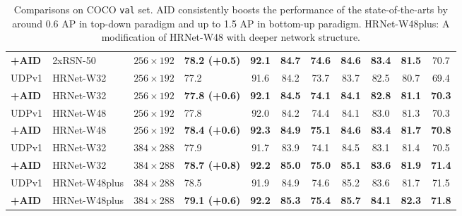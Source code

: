 \documentclass[final]{cvpr}
\begin{document}
\begin{table*}
\begin{center}
\begin{tabular}{l|l|c|lccccccc}
\textbf{+AID}            & 2xRSN-50      &$256\times192$    &\textbf{78.2 (+0.5)}  &\textbf{92.1}  &\textbf{84.7}  &\textbf{74.6}  &\textbf{84.6}  &\textbf{83.4} &\textbf{81.5}  &70.7\\
UDPv1 \cite{UDP}         & HRNet-W32     &$256\times192$    &77.2                 & 91.6          & 84.2          & 73.7          &83.7           &82.5          &80.7           &69.4\\
\textbf{+AID}            & HRNet-W32     &$256\times192$    &\textbf{77.8 (+0.6)}  & \textbf{92.1} & \textbf{84.5} & \textbf{74.1} &\textbf{84.1}  &\textbf{82.8} &\textbf{81.1}  &\textbf{70.3}\\
UDPv1 \cite{UDP}         & HRNet-W48     &$256\times192$    &77.8                 & 92.0          & 84.2          & 74.4          &84.1           &83.0          &81.3           &70.3\\
\textbf{+AID }           & HRNet-W48     &$256\times192$    &\textbf{78.4 (+0.6)}  & \textbf{92.3} & \textbf{84.9} & \textbf{75.1} &\textbf{84.6}  &\textbf{83.4} &\textbf{81.7}  &\textbf{70.8}\\
UDPv1 \cite{UDP}         & HRNet-W32     &$384\times288$    &77.9                 & 91.7          & 83.9          & 74.1          &84.5           &83.1          &81.4           &70.5\\
\textbf{+AID}            & HRNet-W32     &$384\times288$    &\textbf{78.7 (+0.8)}  & \textbf{92.2} & \textbf{85.0} & \textbf{75.0} &\textbf{85.1}  &\textbf{83.6} &\textbf{81.9}  &\textbf{71.4}\\
UDPv1 \cite{UDP}         & HRNet-W48plus &$384\times288$    &78.5                 & 91.9          & 84.9          & 74.6          &85.2           &83.6          &81.7           &71.5\\
\textbf{+AID }           & HRNet-W48plus &$384\times288$    &\textbf{79.1 (+0.6)}  & \textbf{92.2} & \textbf{85.3} & \textbf{75.4} &\textbf{85.7}  &\textbf{84.1} &\textbf{82.3}  &\textbf{71.8}\\
\hline

\hline
\end{tabular}
\end{center}
\caption{Comparisons on COCO \texttt{val} set. AID consistently boosts the performance of the state-of-the-arts by around 0.6 AP in top-down paradigm and up to 1.5 AP in bottom-up paradigm. HRNet-W48plus: A modification of HRNet-W48 with deeper network structure.}
\label{tab:val}
\end{table*}
\end{document}
